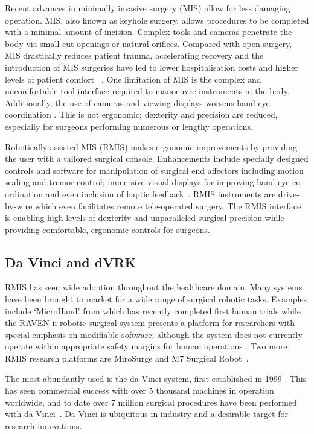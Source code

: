 \documentclass[english]{sobraep}
\begin{document}
\par{Recent advances in minimally invasive surgery (MIS) allow for less damaging operation. MIS, also known as keyhole surgery, allows procedures to be completed with a minimal amount of incision. Complex tools and cameras penetrate the body via small cut openings or natural orifices. Compared with open surgery, MIS drastically reduces patient trauma, accelerating recovery and the introduction of MIS surgeries have led to lower hospitalisation costs and higher levels of patient comfort ~\cite{laparoscopic-vs-open,intro-rmis}. One limitation of MIS is the complex and uncomfortable tool interface required to manoeuvre instruments in the body. Additionally, the use of cameras and viewing displays worsens hand-eye coordination \cite{intro-rmis, force-sensing}. This is not ergonomic; dexterity and precision are reduced, especially for surgeons performing numerous or lengthy operations.}

\par{Robotically-assisted MIS (RMIS) makes ergonomic improvements by providing the user with a tailored surgical console. Enhancements include specially designed controls and software for manipulation of surgical end affectors including motion scaling and tremor control; immersive visual displays for improving hand-eye co-ordination and even inclusion of haptic feedback~\cite{intro-rmis}. RMIS instruments are drive-by-wire which even facilitates remote tele-operated surgery. The RMIS interface is enabling high levels of dexterity and unparalleled surgical precision while providing comfortable, ergonomic controls for surgeons.} 

\subsection{Da Vinci and dVRK}
\par{RMIS has seen wide adoption throughout the healthcare domain. Many systems have been brought to market for a wide range of surgical robotic tasks. Examples include `MicroHand' from \citeauthor{microhand2} which has recently completed first human trials \cite{microhand2} while the RAVEN-ii robotic surgical system presents a platform for researchers with special emphasis on modifiable software; although the system does not currently operate within appropriate safety margins for human operations \cite{raven-ii}. Two more RMIS research platforms are MiroSurge and M7 Surgical Robot~\cite[Table 1]{other-rmis-machines}.}

\par{The most abundantly used is the da Vinci system, first established in 1999 \cite{ergonomics, 10-years-dvrk}. This has seen commercial success with over 5 thousand machines in operation worldwide, and to date over 7 million surgical procedures have been performed with da Vinci~\cite{10-years-dvrk}. Da Vinci is ubiquitous in industry and a desirable target for research innovations.}
\end{document}
